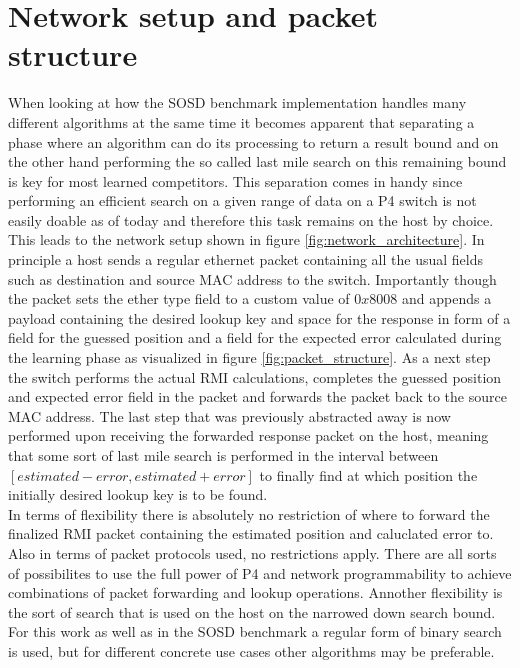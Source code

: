 \section{Network setup and packet structure}
\label{sect:rmionbmv2:network}
When looking at how the SOSD benchmark implementation handles many different algorithms at the same time it becomes apparent that separating a phase where an algorithm can do its processing to return a result bound and on the other hand performing the so called last mile search on this remaining bound is key for most learned competitors. This separation comes in handy since performing an efficient search on a given range of data on a P4 switch is not easily doable as of today and therefore this task remains on the host by choice. This leads to the network setup shown in figure \ref{fig:network_architecture}. In principle a host sends a regular ethernet packet containing all the usual fields such as destination and source MAC address to the switch. Importantly though the packet sets the ether type field to a custom value of $0x8008$ and appends a payload containing the desired lookup key and space for the response in form of a field for the guessed position and a field for the expected error calculated during the learning phase as visualized in figure \ref{fig:packet_structure}. As a next step the switch performs the actual RMI calculations, completes the guessed position and expected error field in the packet and forwards the packet back to the source MAC address. The last step that was previously abstracted away is now performed upon receiving the forwarded response packet on the host, meaning that some sort of last mile search is performed in the interval between \([estimated - error, estimated + error]\) to finally find at which position the initially desired lookup key is to be found.\\

In terms of flexibility there is absolutely no restriction of where to forward the finalized RMI packet containing the estimated position and caluclated error to. Also in terms of packet protocols used, no restrictions apply. There are all sorts of possibilites to use the full power of P4 and network programmability to achieve combinations of packet forwarding and lookup operations. Annother flexibility is the sort of search that is used on the host on the narrowed down search bound. For this work as well as in the SOSD benchmark a regular form of binary search is used, but for different concrete use cases other algorithms may be preferable.

